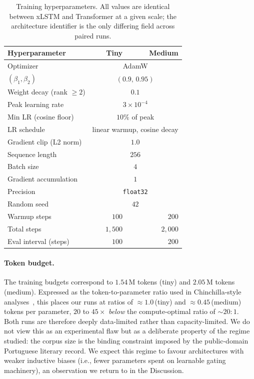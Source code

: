 \documentclass[11pt]{article}
\begin{document}
\begin{table}[h]
\centering
\caption{Training hyperparameters. All values are identical between
  xLSTM and Transformer at a given scale; the architecture identifier is
  the only differing field across paired runs.}
\label{tab:hyperparams}
\small
\begin{tabular}{lrr}
\toprule
Hyperparameter & Tiny & Medium \\
\midrule
Optimizer                 & \multicolumn{2}{c}{AdamW} \\
$(\beta_1, \beta_2)$      & \multicolumn{2}{c}{$(0.9,\, 0.95)$} \\
Weight decay (rank $\ge 2$) & \multicolumn{2}{c}{$0.1$} \\
Peak learning rate        & \multicolumn{2}{c}{$3\times 10^{-4}$} \\
Min LR (cosine floor)     & \multicolumn{2}{c}{$10\%$ of peak} \\
LR schedule               & \multicolumn{2}{c}{linear warmup, cosine decay} \\
Gradient clip (L2 norm)   & \multicolumn{2}{c}{$1.0$} \\
Sequence length           & \multicolumn{2}{c}{$256$} \\
Batch size                & \multicolumn{2}{c}{$4$} \\
Gradient accumulation     & \multicolumn{2}{c}{$1$} \\
Precision                 & \multicolumn{2}{c}{\texttt{float32}} \\
Random seed               & \multicolumn{2}{c}{$42$} \\
\midrule
Warmup steps              & $100$  & $200$ \\
Total steps               & $1{,}500$ & $2{,}000$ \\
Eval interval (steps)     & $100$  & $200$ \\
\bottomrule
\end{tabular}
\end{table}

\paragraph{Token budget.}
The training budgets correspond to $1.54$\,M tokens (tiny) and $2.05$\,M
tokens (medium). Expressed as the token-to-parameter ratio used in
Chinchilla-style analyses~\cite{hoffmann2022}, this places our runs at
ratios of $\approx 1.0$\,(tiny) and $\approx 0.45$\,(medium) tokens per
parameter, $20$ to $45\times$ \emph{below} the compute-optimal ratio of
$\sim 20{:}1$. Both runs are therefore deeply data-limited rather than
capacity-limited. We do not view this as an experimental flaw but as a
deliberate property of the regime studied: the corpus size is the
binding constraint imposed by the public-domain Portuguese literary
record. We expect this regime to favour architectures with weaker
inductive biases (i.e., fewer parameters spent on learnable gating
machinery), an observation we return to in the Discussion.
\end{document}
